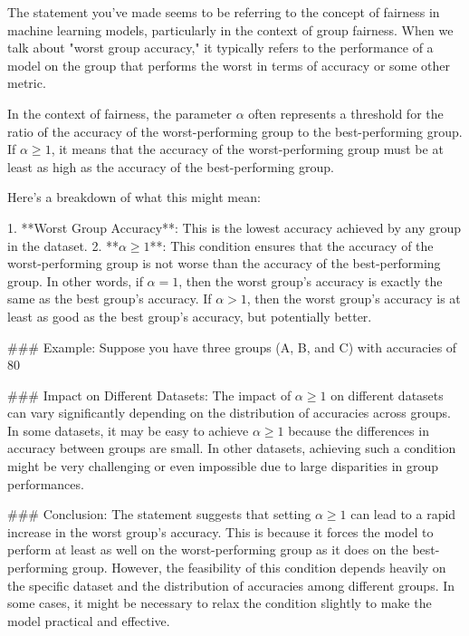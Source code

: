 The statement you've made seems to be referring to the concept of fairness in machine learning models, particularly in the context of group fairness. When we talk about "worst group accuracy," it typically refers to the performance of a model on the group that performs the worst in terms of accuracy or some other metric.

In the context of fairness, the parameter \(\alpha\) often represents a threshold for the ratio of the accuracy of the worst-performing group to the best-performing group. If \(\alpha \geq 1\), it means that the accuracy of the worst-performing group must be at least as high as the accuracy of the best-performing group.

Here's a breakdown of what this might mean:

1. **Worst Group Accuracy**: This is the lowest accuracy achieved by any group in the dataset.
2. **\(\alpha \geq 1\)**: This condition ensures that the accuracy of the worst-performing group is not worse than the accuracy of the best-performing group. In other words, if \(\alpha = 1\), then the worst group's accuracy is exactly the same as the best group's accuracy. If \(\alpha > 1\), then the worst group's accuracy is at least as good as the best group's accuracy, but potentially better.

### Example:
Suppose you have three groups (A, B, and C) with accuracies of 80%

### Impact on Different Datasets:
The impact of \(\alpha \geq 1\) on different datasets can vary significantly depending on the distribution of accuracies across groups. In some datasets, it may be easy to achieve \(\alpha \geq 1\) because the differences in accuracy between groups are small. In other datasets, achieving such a condition might be very challenging or even impossible due to large disparities in group performances.

### Conclusion:
The statement suggests that setting \(\alpha \geq 1\) can lead to a rapid increase in the worst group's accuracy. This is because it forces the model to perform at least as well on the worst-performing group as it does on the best-performing group. However, the feasibility of this condition depends heavily on the specific dataset and the distribution of accuracies among different groups. In some cases, it might be necessary to relax the condition slightly to make the model practical and effective.